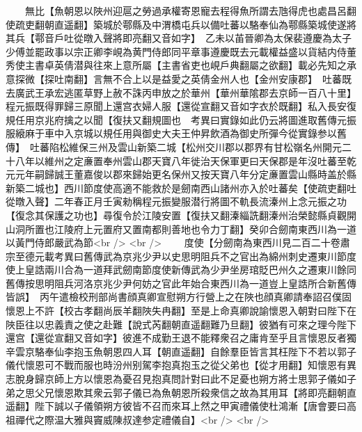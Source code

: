 　　無比【魚朝恩以陜州迎扈之勞過承權寄恩寵去程得魚所謂去虺得虎也處昌呂翻使疏吏翻朝直遥翻】築城於鄠縣及中渭橋屯兵以備吐蕃以駱奉仙為鄠縣築城使遂將其兵【鄠音戶吐從暾入聲將即亮翻又音如字】　乙未以苖晉卿為太保裴遵慶為太子少傅並罷政事以宗正卿李峴為黄門侍郎同平章事遵慶既去元載權益盛以貨結内侍董秀使主書卓英倩潜與往來上意所屬【主書省吏也峴戶典翻屬之欲翻】載必先知之承意探微【探吐南翻】言無不合上以是益愛之英倩金州人也【金州安康郡】　吐蕃既去廣武王承宏逃匿草野上赦不誅丙申放之於華州【華州華隂郡去京師一百八十里】　程元振既得罪歸三原聞上還宫衣婦人服【還從宣翻又音如字衣於既翻】私入長安復規任用京兆府擒之以聞【復扶又翻規圖也　考異曰實錄如此仍云將圖進取舊傳元振服縗麻于車中入京城以規任用與御史大夫王仲昇飲酒為御史所彈今從實錄参以舊傳】　吐蕃陷松維保三州及雲山新築二城【松州交川郡以郡界有甘松嶺名州開元二十八年以維州之定亷置奉州雲山郡天寶八年徙治天保軍更曰天保郡是年沒吐蕃至乾元元年嗣歸誠王董嘉俊以郡來歸始更名保州又按天寶八年分定亷置雲山縣時盖於縣新築二城也】西川節度使高適不能救於是劒南西山諸州亦入於吐蕃矣【使疏吏翻吐從暾入聲】二年春正月壬寅勑稱程元振變服潜行將圖不軌長流溱州上念元振之功【復念其保護之功也】尋復令於江陵安置【復扶又翻溱緇詵翻溱州治榮懿縣貞觀開山洞所置也江陵府上元置府又置南都則善地也令力丁翻】癸卯合劒南東西川為一道以黃門侍郎嚴武為節<br />
<br />
　　度使【分劒南為東西川見二百二十卷肅宗至德元載考異曰舊傳武為京兆少尹以史思明阻兵不之官出為綿州刺史遷東川節度使上皇誥兩川合為一道拜武劒南節度使新傳武為少尹坐房琯貶巴州久之遷東川餘同舊傳按思明阻兵河洛京兆少尹何妨之官此年始合東西川為一道豈上皇誥所合新舊傳皆誤】　丙午遣檢校刑部尚書顔真卿宣慰朔方行營上之在陜也顔真卿請奉詔召僕固懷恩上不許【校古孝翻尚辰羊翻陜失冉翻】至是上命真卿說諭懷恩入朝對曰陛下在陜臣往以忠義責之使之赴難【說式芮翻朝直遥翻難乃旦翻】彼猶有可來之理今陛下還宫【還從宣翻又音如字】彼進不成勤王退不能釋衆召之庸肯至乎且言懷恩反者獨辛雲京駱奉仙李抱玉魚朝恩四人耳【朝直遥翻】自餘羣臣皆言其枉陛下不若以郭子儀代懷恩可不戰而服也時汾州别駕李抱真抱玉之從父弟也【從才用翻】知懷恩有異志脫身歸京師上方以懷恩為憂召見抱真問計對曰此不足憂也朔方將士思郭子儀如子弟之思父兄懷恩欺其衆云郭子儀已為魚朝恩所殺衆信之故為其用耳【將即亮翻朝直遥翻】陛下誠以子儀領朔方彼皆不召而來耳上然之甲寅禮儀使杜鴻漸【唐會要曰高祖禪代之際温大雅與竇威陳叔達参定禮儀自】<br />
<br />
